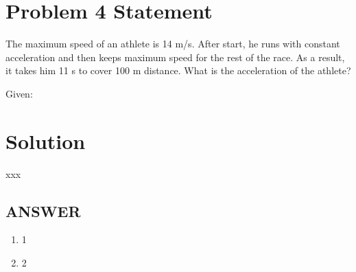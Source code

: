 \section*{Problem 4 Statement}

The maximum speed of an athlete is 14 m/s. After start, he runs with constant acceleration and
then keeps maximum speed for the rest of the race. As a result, it takes him 11 s to cover 100 m
distance. What is the acceleration of the athlete?

Given:


\section*{Solution}

xxx

\vfill
\subsection*{ANSWER}
\begin{enumerate}
    \item 1
    \item 2
\end{enumerate}
